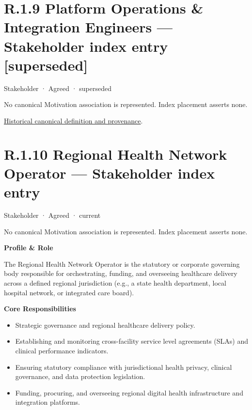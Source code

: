 \section*{R.1.9 Platform Operations \& Integration Engineers — Stakeholder index entry [superseded]}
\label{navigation:R.1.9}

\label{element:c20aa17ce4aa4a58be5eb3cff2ecdd1d}
{\small Stakeholder · Agreed · superseded}\par
No canonical Motivation association is represented. Index placement asserts none.\par
\href{../../../../../../../continuum/motivation/stakeholder/c20aa17ce4aa4a58be5eb3cff2ecdd1d.md}{Historical canonical definition and provenance}.\par
\section*{R.1.10 Regional Health Network Operator — Stakeholder index entry}
\label{navigation:R.1.10}

\label{element:e76216c494fa4500bb80eda6f83513c1}
{\small Stakeholder · Agreed · current}\par
No canonical Motivation association is represented. Index placement asserts none.\par

\par\medskip\textbf{Profile \& Role}\par


The Regional Health Network Operator is the statutory or corporate governing body responsible for orchestrating, funding, and overseeing healthcare delivery across a defined regional jurisdiction (e.g., a state health department, local hospital network, or integrated care board).



\par\medskip\textbf{Core Responsibilities}\par


\begin{itemize}


\item Strategic governance and regional healthcare delivery policy.

\item Establishing and monitoring cross-facility service level agreements (SLAs) and clinical performance indicators.

\item Ensuring statutory compliance with jurisdictional health privacy, clinical governance, and data protection legislation.

\item Funding, procuring, and overseeing regional digital health infrastructure and integration platforms.

\end{itemize}


